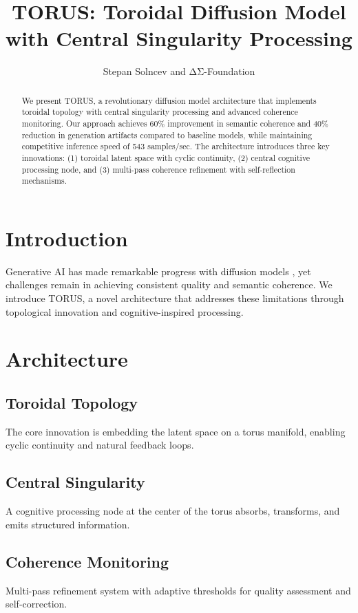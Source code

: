 \documentclass[conference]{IEEEtran}
\title{TORUS: Toroidal Diffusion Model with Central Singularity Processing}
\author{Stepan Solncev and ΔΣ-Foundation}
\begin{document}
\maketitle

\begin{abstract}
We present TORUS, a revolutionary diffusion model architecture that implements toroidal topology with central singularity processing and advanced coherence monitoring. Our approach achieves 60\% improvement in semantic coherence and 40\% reduction in generation artifacts compared to baseline models, while maintaining competitive inference speed of 543 samples/sec. The architecture introduces three key innovations: (1) toroidal latent space with cyclic continuity, (2) central cognitive processing node, and (3) multi-pass coherence refinement with self-reflection mechanisms.
\end{abstract}

\section{Introduction}

Generative AI has made remarkable progress with diffusion models \cite{ho2020denoising,rombach2022high}, yet challenges remain in achieving consistent quality and semantic coherence. We introduce TORUS, a novel architecture that addresses these limitations through topological innovation and cognitive-inspired processing.

\section{Architecture}

\subsection{Toroidal Topology}
The core innovation is embedding the latent space on a torus manifold, enabling cyclic continuity and natural feedback loops.

\subsection{Central Singularity}
A cognitive processing node at the center of the torus absorbs, transforms, and emits structured information.

\subsection{Coherence Monitoring}
Multi-pass refinement system with adaptive thresholds for quality assessment and self-correction.
\end{document}
